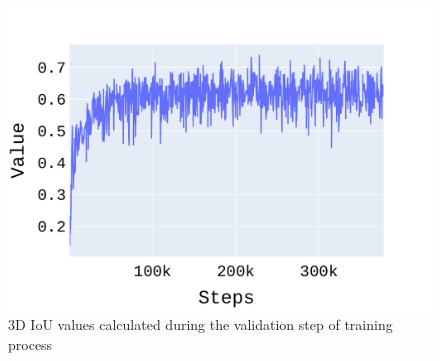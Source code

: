 \documentclass[10pt,twocolumn,letterpaper]{article}
\begin{document}
\begin{figure}[!htbp]
	\centering
	\includegraphics[scale = 0.4]{./images/LYFT_Detections/iou_3d.pdf}
	\caption{3D IoU values calculated during the validation step of training process}
	\label{fig:IoU_F-PointNet}
\end{figure}
 
\end{document}
